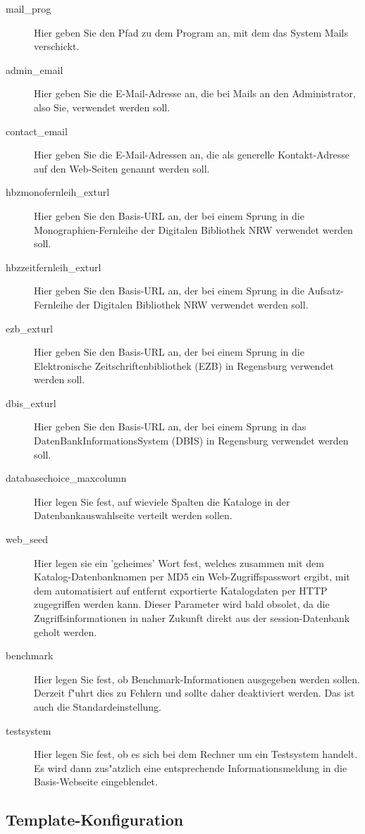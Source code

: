 \documentclass[11pt, twoside, a4paper, BCOR8mm, DIV12, bibtotoc,idxtotoc]{scrbook}
\begin{document}
\begin{description}
\item[mail\_prog] Hier geben Sie den Pfad zu dem Program an, mit dem
  das System Mails verschickt.
\item[admin\_email] Hier geben Sie die E-Mail-Adresse an, die bei Mails
  an den Administrator, also Sie, verwendet werden soll.
\item[contact\_email] Hier geben Sie die E-Mail-Adressen an, die als
  generelle Kontakt-Adresse auf den Web-Seiten genannt werden soll.
\item[hbzmonofernleih\_exturl] Hier geben Sie den Basis-URL an, der bei
  einem Sprung in die Mono\-graphien-Fernleihe der Digitalen Bibliothek
  NRW verwendet werden soll.
\item[hbzzeitfernleih\_exturl] Hier geben Sie den Basis-URL an, der bei
  einem Sprung in die Aufsatz-Fernleihe der Digitalen Bibliothek
  NRW verwendet werden soll.
\item[ezb\_exturl] Hier geben Sie den Basis-URL an, der bei
  einem Sprung in die Elektronische Zeitschriftenbibliothek (EZB) in
  Regensburg verwendet werden soll.
\item[dbis\_exturl] Hier geben Sie den Basis-URL an, der bei einem
  Sprung in das DatenBankInformationsSystem (DBIS)  in Regensburg
  verwendet werden soll. 
\item[databasechoice\_maxcolumn] Hier legen Sie fest, auf wieviele
  Spalten die Kataloge in der Datenbankauswahlseite verteilt werden
  sollen. 
\item[web\_seed] Hier legen sie ein 'geheimes' Wort fest, welches
  zusammen mit dem Katalog-Datenbanknamen per MD5 ein
  Web-Zugriffspasswort ergibt, mit dem automatisiert auf entfernt
  exportierte Katalogdaten per HTTP zugegriffen werden kann. Dieser
  Parameter wird bald obsolet, da die Zugriffsinformationen in naher
  Zukunft direkt aus der session-Datenbank geholt werden.
\item[benchmark] Hier legen Sie fest, ob Benchmark-Informationen
  ausgegeben werden sollen. Derzeit f"uhrt dies zu Fehlern und sollte
  daher deaktiviert werden. Das ist auch die Standardeinstellung.
\item[testsystem] Hier legen Sie fest, ob es sich bei dem Rechner um
  ein Testsystem handelt. Es wird dann zus"atzlich eine entsprechende
  Informationsmeldung in die Basis-Webseite eingeblendet.
\end{description}


\subsection{Template-Konfiguration}
\end{document}
